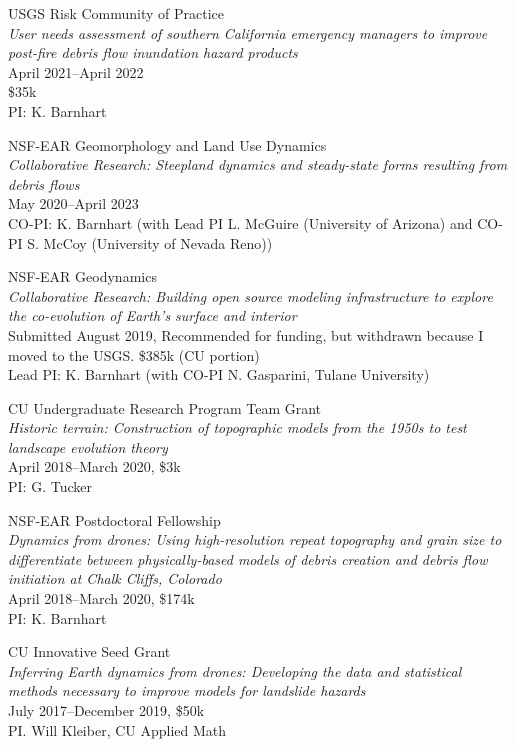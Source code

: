 \documentclass[10pt]{article}
\begin{document}
\begin{outerlist}
	\item 
	USGS Risk Community of Practice\\ 
	\textit{User needs assessment of southern California emergency managers to improve post-fire debris flow inundation hazard products}\\
	April 2021--April 2022\\
	\$35k \\
	PI: K. Barnhart
	
	\item 
	NSF-EAR Geomorphology and Land Use Dynamics\\ 
	\textit{Collaborative Research: Steepland dynamics and steady-state forms resulting from debris flows}\\
	May 2020--April 2023\\
	CO-PI: K. Barnhart (with Lead PI L. McGuire (University of Arizona) and CO-PI S. McCoy (University of Nevada Reno))
	
	\item NSF-EAR Geodynamics\\ 
	\textit{Collaborative Research: Building open source modeling infrastructure to explore the co-evolution of Earth's surface and interior}\\
	Submitted August 2019, Recommended for funding, but withdrawn because I moved to the USGS. \$385k (CU portion)\\
	Lead PI: K. Barnhart (with CO-PI N. Gasparini, Tulane University)
	
	\item CU Undergraduate Research Program Team Grant\\
	\textit{Historic terrain: Construction of topographic models from the 1950s to test landscape evolution theory}\\
	April 2018--March 2020, \$3k\\
	PI: G. Tucker
	
	\item NSF-EAR Postdoctoral Fellowship\\ 
	\textit{Dynamics from drones: Using high-resolution repeat topography and grain size to differentiate between physically-based models of debris creation and debris flow initiation at Chalk Cliffs, Colorado}\\
	April 2018--March 2020, \$174k\\
	PI: K. Barnhart
	
	\item CU Innovative Seed Grant\\ 
	\textit{Inferring Earth dynamics from drones:  Developing the data and statistical methods necessary to improve models for landslide hazards}\\
	July 2017--December 2019, \$50k\\
	PI. Will Kleiber, CU Applied Math
	

\end{outerlist}
\end{document}
